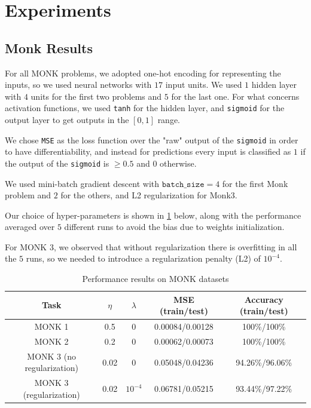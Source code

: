 \section{Experiments}

\subsection{Monk Results}

For all MONK problems, we adopted one-hot encoding for representing the inputs, so we used neural networks with $17$ input units. We used $1$ hidden layer with $4$ units for the first two problems and $5$ for the last one. For what concerns activation functions, we used \texttt{tanh} for the hidden layer, and \texttt{sigmoid} for the output layer to get outputs in the $[0, 1]$ range.

We chose \texttt{MSE} as the loss function over the "raw" output of the \texttt{sigmoid} in order to have differentiability, and instead for predictions every input is classified as $1$ if the output of the \texttt{sigmoid} is $\ge 0.5$ and $0$ otherwise.

We used mini-batch gradient descent with $\texttt{batch\_size} = 4$ for the first Monk problem and $2$ for the others, and L2 regularization for Monk3.

Our choice of hyper-parameters is shown in \cref{fig:hyper} below, along with the performance averaged over $5$ different runs to avoid the bias due to weights initialization.

For MONK 3, we observed that without regularization there is overfitting in all the $5$ runs, so we needed to introduce a regularization penalty (L2) of $10^{-4}$.

\begin{table}[htb]
    \centering
    \begin{tabular}{|c|c|c|c|c|}
        \hline 
        Task & $\eta$ & $\lambda$ & MSE (train/test) & Accuracy (train/test) \\ \hline
        MONK 1 & 0.5 & 0 & 0.00084/0.00128  & 100\%/100\% \\ \hline
        MONK 2 & 0.2 & 0 & 0.00062/0.00073 & 100\%/100\% \\ \hline
        MONK 3 (no regularization) & 0.02 & 0 & 0.05048/0.04236 & 94.26\%/96.06\% \\ \hline
        MONK 3 (regularization) & 0.02 & $10^{-4}$ & 0.06781/0.05215 & 93.44\%/97.22\% \\ \hline
    \end{tabular}
    \caption{Performance results on MONK datasets}
    \label{fig:hyper}
\end{table}

